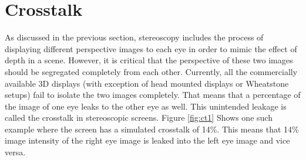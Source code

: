 \section{Crosstalk}
As discussed in the previous section, stereoscopy includes the process of displaying different perspective images to each eye in order to mimic the effect of depth in a scene. However, it is critical that the perspective of these two images should be segregated completely from each other. Currently, all the commercially available 3D displays (with exception of head mounted displays or Wheatstone setups) fail to isolate the two images completely. That means that a percentage of the image of one eye leaks to the other eye as well. This unintended leakage is called the crosstalk in stereoscopic screens\cite{woods2012crosstalk}. Figure \ref{fig:ct1} Shows one such example where the screen has a simulated crosstalk of 14\%. This means that 14\% image intensity of the right eye image is leaked into the left eye image and vice versa.

